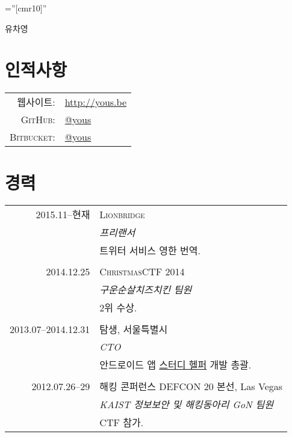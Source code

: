 \documentclass[a4paper,10pt]{article}
\begin{document}

\pagestyle{empty} %

\font\fb=''[cmr10]'' %

\par{\centering
{\Huge 유차영
}\bigskip\par}

\section{인적사항}

\begin{tabular}{rl}
  \textsc{웹사이트:}  & \url{http://yous.be} \\
  \textsc{GitHub:}    & \href{https://github.com/yous}{@yous} \\
  \textsc{Bitbucket:} & \href{https://bitbucket.org/yous}{@yous}
\end{tabular}

\section{경력}
\begin{tabular}{r|p{11cm}}
  \textsc{2015.11--현재} & \textsc{Lionbridge} \\
  & \emph{프리랜서} \\
  & 트위터 서비스 영한 번역. \\
  \multicolumn{2}{c}{} \\

  \textsc{2014.12.25} & \textsc{ChristmasCTF 2014} \\
  & \emph{구운순살치즈치킨 팀원} \\
  & 2위 수상. \\
  \multicolumn{2}{c}{} \\

  \textsc{2013.07--2014.12.31} & \textsc{탐생}, 서울특별시 \\
  & \emph{CTO} \\
  & 안드로이드 앱 \href{https://play.google.com/store/apps/details?id=kr.co.tamseng.StudyHelper}{스터디 헬퍼} 개발 총괄. \\
  \multicolumn{2}{c}{} \\

  \textsc{2012.07.26--29} & \textsc{해킹 콘퍼런스 DEFCON 20 본선}, Las Vegas \\
  & \emph{KAIST 정보보안 및 해킹동아리 GoN 팀원} \\
  & CTF 참가.
\end{tabular}
\end{document}
